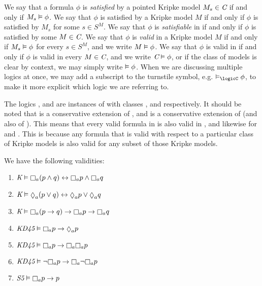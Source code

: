 We say that a formula $\phi$ is {\em satisfied} by a pointed Kripke model $M_s
\in \textit{C}$ if and only if $M_s \vDash \phi$. We say that $\phi$ is satisfied
by a Kripke model $M$ if and only if $\phi$ is satisfied by $M_s$ for some $s
\in S^M$.  We say that $\phi$ is {\em satisfiable} in \classC{} if and only if
$\phi$ is satisfied by some $M \in \textit{C}{}$. We say that $\phi$ is {\em valid}
in a Kripke model $M$ if and only if $M_s \vDash \phi$ for every $s \in S^M$,
and we write $M \vDash \phi$. We say that $\phi$ is valid in \classC{} if and
only if $\phi$ is valid in every $M \in \textit{C}{}$, and we write $\textit{C}{}
\vDash \phi$, or if the class of models is clear by context, we may simply
write $\vDash \phi$. When we are discussing multiple logics at once, we may
add a subscript to the turnstile symbol, e.g. $\entails_\logicC \phi$, to make
it more explicit which logic we are referring to.

The logics \logicK{}, \logicKD{} and \logicS{} are instances of \logicC{} with
classes \classK{}, \classKD{} and \classS{} respectively. It should be noted
that \logicKD{} is a conservative extension of \logicK{}, and \logicS{} is a
conservative extension of \logicKD{} (and also of \logicK{}). This means that
every valid formula in \logicK{} is also valid in \logicKD{}, and likewise for
\logicKD{} and \logicS{}. This is because any formula that is valid with respect
to a particular class of Kripke models is also valid for any subset of those
Kripke models.

\begin{proposition}\label{modal-properties}
We have the following validities:

\begin{enumerate}
\item $\classK \entails \knows_a (p \land q) \iff \knows_a p \land
\knows_a q$
\item $\classK \entails \suspects_a (p \lor q) \iff \suspects_a p \lor
\suspects_a q$
\item $\classK \entails \knows_a (p \implies q) \implies \knows_a p
\implies \knows_a q$
\item $\classKD \entails \knows_a p \implies \suspects_a p$
\item $\classKD \entails \knows_a p \implies \knows_a \knows_a p$
\item $\classKD \entails \neg\knows_a p \implies \knows_a \neg \knows_a p$
\item $\classS \entails \knows_a p \implies p$
\end{enumerate}
\end{proposition}

